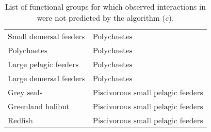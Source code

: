 \begin{table}[h!]
\begin{tabular}{|l|l|}
    Small demersal feeders & Polychaetes    \\
    Polychaetes            & Polychaetes    \\
    Large pelagic feeders  & Polychaetes    \\
    Large demersal feeders & Polychaetes    \\
    Grey seals             & Piscivorous small pelagic feeders  \\
    Greenland halibut      & Piscivorous small pelagic feeders  \\
    Redfish                & Piscivorous small pelagic feeders  \\
    \hline
  \end{tabular}
  \caption{List of functional groups for which observed interactions in \citet{savenkoff2004} were not predicted by the algorithm ($c$).}
\end{table}
